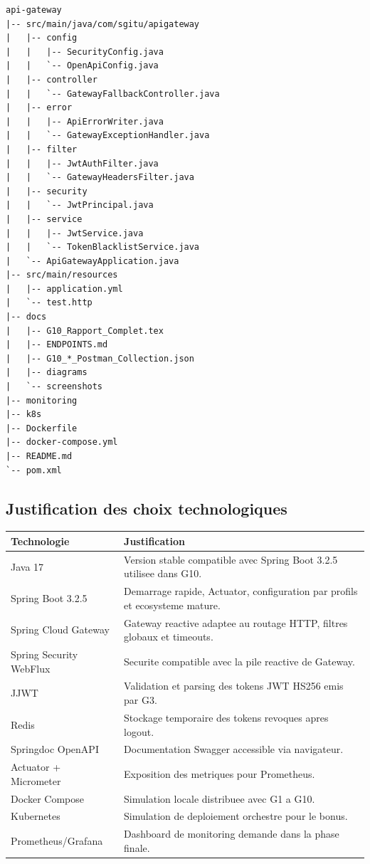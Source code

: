 \documentclass[12pt,a4paper]{article}
\begin{document}
\begin{lstlisting}[style=code]
api-gateway
|-- src/main/java/com/sgitu/apigateway
|   |-- config
|   |   |-- SecurityConfig.java
|   |   `-- OpenApiConfig.java
|   |-- controller
|   |   `-- GatewayFallbackController.java
|   |-- error
|   |   |-- ApiErrorWriter.java
|   |   `-- GatewayExceptionHandler.java
|   |-- filter
|   |   |-- JwtAuthFilter.java
|   |   `-- GatewayHeadersFilter.java
|   |-- security
|   |   `-- JwtPrincipal.java
|   |-- service
|   |   |-- JwtService.java
|   |   `-- TokenBlacklistService.java
|   `-- ApiGatewayApplication.java
|-- src/main/resources
|   |-- application.yml
|   `-- test.http
|-- docs
|   |-- G10_Rapport_Complet.tex
|   |-- ENDPOINTS.md
|   |-- G10_*_Postman_Collection.json
|   |-- diagrams
|   `-- screenshots
|-- monitoring
|-- k8s
|-- Dockerfile
|-- docker-compose.yml
|-- README.md
`-- pom.xml
\end{lstlisting}

\subsection{Justification des choix technologiques}

\begin{longtable}{p{4cm}p{10cm}}
\toprule
\textbf{Technologie} & \textbf{Justification} \\
\midrule
Java 17 & Version stable compatible avec Spring Boot 3.2.5 utilisee dans G10. \\
Spring Boot 3.2.5 & Demarrage rapide, Actuator, configuration par profils et ecosysteme mature. \\
Spring Cloud Gateway & Gateway reactive adaptee au routage HTTP, filtres globaux et timeouts. \\
Spring Security WebFlux & Securite compatible avec la pile reactive de Gateway. \\
JJWT & Validation et parsing des tokens JWT HS256 emis par G3. \\
Redis & Stockage temporaire des tokens revoques apres logout. \\
Springdoc OpenAPI & Documentation Swagger accessible via navigateur. \\
Actuator + Micrometer & Exposition des metriques pour Prometheus. \\
Docker Compose & Simulation locale distribuee avec G1 a G10. \\
Kubernetes & Simulation de deploiement orchestre pour le bonus. \\
Prometheus/Grafana & Dashboard de monitoring demande dans la phase finale. \\
\bottomrule
\end{longtable}
\end{document}
